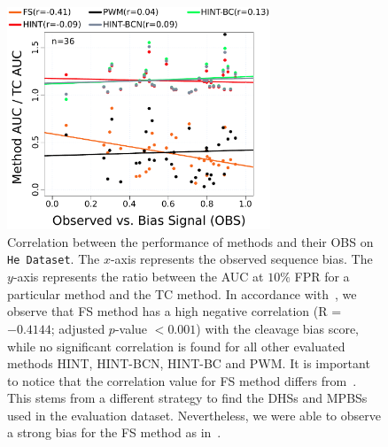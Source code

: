 \documentclass[11pt]{article}
\begin{document}
\begin{figure}[h!]
\centering
\includegraphics[width=0.70\textwidth]{Figs/Fig3.pdf}
\caption{Correlation between the performance of methods and their OBS on {\tt He Dataset}. The $x$-axis represents the observed sequence bias. The $y$-axis represents the ratio between the AUC at $10\%$ FPR for a particular method and the TC method. In accordance with~\cite{he2014}, we observe that FS method has a high negative correlation (R = $-0.4144$; adjusted $p$-value $<0.001$) with the cleavage bias score, while no significant correlation is found for all other evaluated methods HINT, HINT-BCN, HINT-BC and PWM. It is important to notice that the correlation value for FS method differs from~\cite{he2014}. This stems from a different strategy to find the DHSs and MPBSs used in the evaluation dataset. Nevertheless, we were able to observe a strong bias for the FS method as in~\cite{he2014}.}
\label{fig:tcbiasuwk}
\end{figure}

\clearpage
\end{document}
